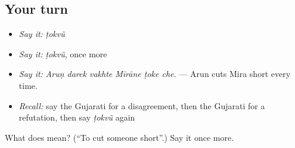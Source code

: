\subsection*{Your turn}
\begin{itemize}
\raggedright
  \item \emph{Say it:} \emph{ṭokvũ}
  \item \emph{Say it:} \emph{ṭokvũ}, once more
  \item \emph{Say it:} \emph{Aruṇ darek vakhte Mīrāne ṭoke che.} — Arun cuts Mira short every time.
  \item \emph{Recall:} say the Gujarati for a disagreement, then the Gujarati for a refutation, then say \emph{ṭokvũ} again
\end{itemize}

\begin{tcolorbox}[breakable,colback=teal!4,colframe=teal!35!black,title={Before you move on}]
What does  mean? (\textquotedblleft{}To cut someone short\textquotedblright{}.) Say it once more.
\end{tcolorbox}
